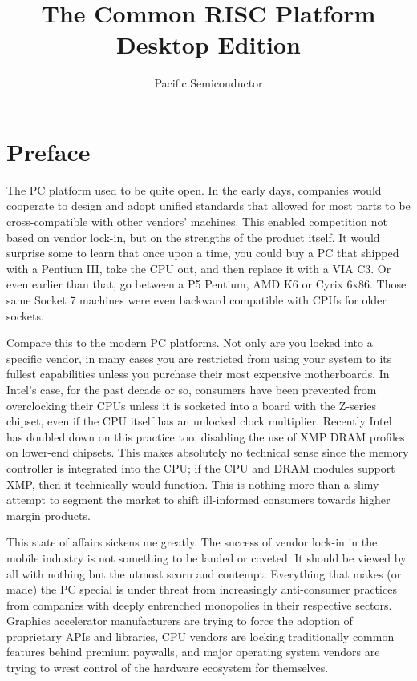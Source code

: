 \documentclass[12pt]{report}
\title{The Common RISC Platform\\ \large{Desktop Edition}}
\author{Pacific Semiconductor}
\begin{document}
\maketitle

\newpage

\tableofcontents
\newpage

\section{Preface}
The PC platform used to be quite open. In the early days, companies would cooperate to design and adopt unified
standards that allowed for most parts to be cross-compatible with other vendors' machines. This enabled competition not
based on vendor lock-in, but on the strengths of the product itself. It would surprise some to learn that once upon a time,
you could buy a PC that shipped with a Pentium III, take the CPU out, and then replace it with a VIA C3. Or even earlier
than that, go between a P5 Pentium, AMD K6 or Cyrix 6x86. Those same Socket 7 machines were even backward compatible
with CPUs for older sockets.

Compare this to the modern PC platforms. Not only are you locked into a specific vendor, in many cases you are restricted
from using your system to its fullest capabilities unless you purchase their most expensive motherboards. In Intel's case,
for the past decade or so, consumers have been prevented from overclocking their CPUs unless it is socketed into a board
with the Z-series chipset, even if the CPU itself has an unlocked clock multiplier. Recently Intel has doubled down on this
practice too, disabling the use of XMP DRAM profiles on lower-end chipsets. This makes absolutely no technical sense
since the memory controller is integrated into the CPU; if the CPU and DRAM modules support XMP, then it technically would
function. This is nothing more than a slimy attempt to segment the market to shift ill-informed consumers towards higher
margin products.

This state of affairs sickens me greatly. The success of vendor lock-in in the mobile industry is not something to be
lauded or coveted. It should be viewed by all with nothing but the utmost scorn and contempt. Everything that makes (or made)
the PC special is under threat from increasingly anti-consumer practices from companies with deeply entrenched monopolies
in their respective sectors. Graphics accelerator manufacturers are trying to force the adoption of proprietary APIs and
libraries, CPU vendors are locking traditionally common features behind premium paywalls, and major operating system
vendors are trying to wrest control of the hardware ecosystem for themselves.
\end{document}

